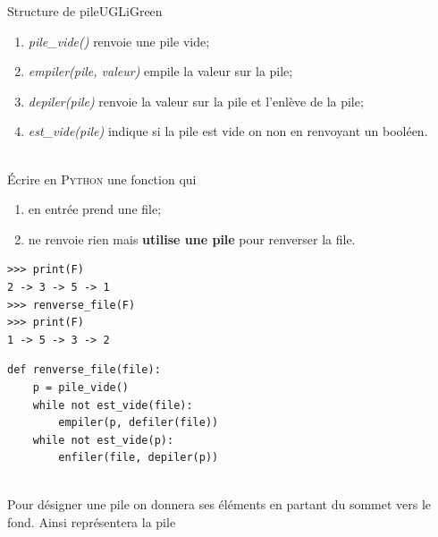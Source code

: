 \documentclass[a4paper,10pt,french]{book}
\begin{document}
\begin{encadrecolore}{Structure de pile}{UGLiGreen}
    \begin{enumerate}[--]
        \item \textit{pile\_vide()} renvoie une pile vide;
        \item \textit{empiler(pile, valeur)} empile la valeur sur la pile;
        \item  \textit{depiler(pile)} renvoie la valeur sur la pile et l'enlève de la pile;
        \item \textit{est\_vide(pile)} indique si la pile est vide on non en renvoyant un booléen.	
    \end{enumerate}
\end{encadrecolore}
    
\exo\\

\'Ecrire en \textsc{Python} une fonction  qui
\begin{enumerate}[--]
    \item 	en entrée prend une file;
    \item 	ne renvoie rien mais \textbf{utilise une pile} pour renverser la file.
\end{enumerate}
\begin{exemple}[ d'utilisation]
\begin{verbatim}
>>> print(F)
2 -> 3 -> 5 -> 1
>>> renverse_file(F)
>>> print(F)
1 -> 5 -> 3 -> 2
\end{verbatim}    
\end{exemple}

\begin{encadre}[Réponse]
\begin{verbatim}
def renverse_file(file):
    p = pile_vide()
    while not est_vide(file):
        empiler(p, defiler(file))
    while not est_vide(p):
        enfiler(file, depiler(p))
\end{verbatim}
\end{encadre}

\exo\\

Pour désigner une pile on donnera ses éléments en partant du sommet vers le fond. Ainsi  représentera la pile 
\begin{center}
\end{center}
\end{document}
